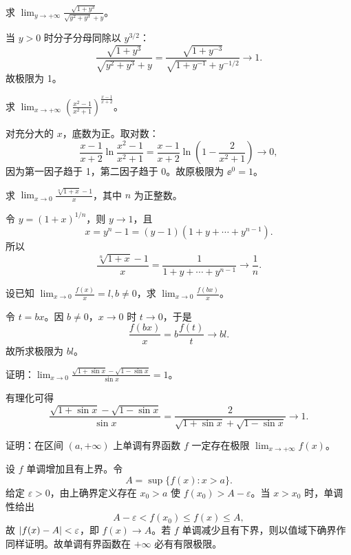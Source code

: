 \begin{xexercise}[2]
求 $\displaystyle\lim_{y\to+\infty}\frac{\sqrt{1+y^3}}{\sqrt{y^2+y^3}+y}$。
\end{xexercise}
\begin{xsolution}
当 $y>0$ 时分子分母同除以 $y^{3/2}$：
\[
  \frac{\sqrt{1+y^3}}{\sqrt{y^2+y^3}+y}
  =\frac{\sqrt{1+y^{-3}}}{\sqrt{1+y^{-1}}+y^{-1/2}}\to1.
\]
故极限为 1。
\end{xsolution}


\begin{xexercise}[3]
求 $\displaystyle\lim_{x\to+\infty}\left(\frac{x^2-1}{x^2+1}\right)^{\frac{x-1}{x+2}}$。
\end{xexercise}
\begin{xsolution}
对充分大的 $x$，底数为正。取对数：
\[
  \frac{x-1}{x+2}\ln\frac{x^2-1}{x^2+1}
  =\frac{x-1}{x+2}\ln\left(1-\frac2{x^2+1}\right)\to0,
\]
因为第一因子趋于 1，第二因子趋于 0。故原极限为 $\ee^0=1$。
\end{xsolution}


\begin{xexercise}[4]
求 $\displaystyle\lim_{x\to0}\frac{\sqrt[n]{1+x}-1}{x}$，其中 $n$ 为正整数。
\end{xexercise}
\begin{xsolution}
令 $y=(1+x)^{1/n}$，则 $y\to1$，且
\[
  x=y^n-1=(y-1)(1+y+\cdots+y^{n-1}).
\]
所以
\[
  \frac{\sqrt[n]{1+x}-1}{x}
  =\frac1{1+y+\cdots+y^{n-1}}\to\frac1n.
\]
\end{xsolution}


\begin{xexercise}[5]
设已知 $\displaystyle\lim_{x\to0}\frac{f(x)}x=l,b\ne0$，求 $\displaystyle\lim_{x\to0}\frac{f(bx)}x$。
\end{xexercise}
\begin{xsolution}
令 $t=bx$。因 $b\ne0$，$x\to0$ 时 $t\to0$，于是
\[
  \frac{f(bx)}x=b\frac{f(t)}t\to bl.
\]
故所求极限为 $bl$。
\end{xsolution}


\begin{xexercise}[6]
证明：$\displaystyle\lim_{x\to0}\frac{\sqrt{1+\sin x}-\sqrt{1-\sin x}}{\sin x}=1$。
\end{xexercise}
\begin{xsolution}
有理化可得
\[
  \frac{\sqrt{1+\sin x}-\sqrt{1-\sin x}}{\sin x}
  =\frac2{\sqrt{1+\sin x}+\sqrt{1-\sin x}}\to1.
\]
\end{xsolution}


\begin{xexercise}[7]
证明：在区间 $(a,+\infty)$ 上单调有界函数 $f$ 一定存在极限 $\lim_{x\to+\infty}f(x)$。
\end{xexercise}
\begin{xsolution}
设 $f$ 单调增加且有上界。令
\[
  A=\sup\{f(x):x>a\}.
\]
给定 $\varepsilon>0$，由上确界定义存在 $x_0>a$ 使 $f(x_0)>A-\varepsilon$。当 $x>x_0$ 时，单调性给出
\[
  A-\varepsilon<f(x_0)\leq f(x)\leq A,
\]
故 $\lvert f(x)-A\rvert<\varepsilon$，即 $f(x)\to A$。若 $f$ 单调减少且有下界，则以值域下确界作同样证明。故单调有界函数在 $+\infty$ 必有有限极限。
\end{xsolution}


